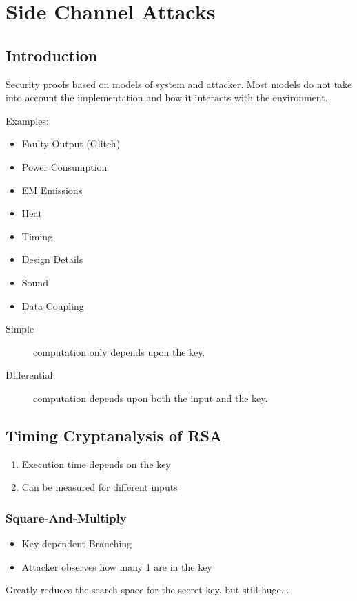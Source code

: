 
\section{Side Channel Attacks}
\subsection{Introduction}
Security proofs based on models of system and attacker. Most models do not take
into account the implementation and how it interacts with the environment.

Examples:
\begin{itemize}
  \item Faulty Output (Glitch)
  \item Power Consumption
  \item EM Emissions
  \item Heat
  \item Timing
  \item Design Details
  \item Sound
  \item Data Coupling
\end{itemize}

\begin{description}
  \item[Simple] computation only depends upon the key.
  \item[Differential] computation depends upon both the input and the key.
\end{description}

\subsection{Timing Cryptanalysis of RSA}
\begin{enumerate}
  \item Execution time depends on the key
  \item Can be measured for different inputs
\end{enumerate}


\subsubsection{Square-And-Multiply}

\begin{itemize}
  \item Key-dependent Branching
  \item Attacker observes how many 1 are in the key
\end{itemize}
Greatly reduces the search space for the secret key, but still huge...

